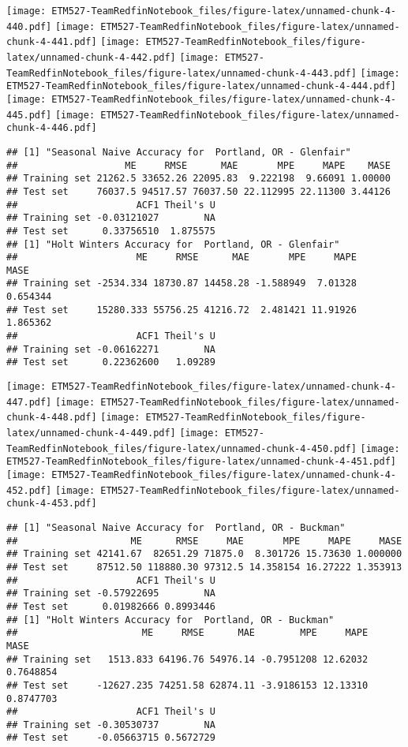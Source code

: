 \documentclass[]{article}
\begin{document}
\texttt{[image: ETM527-TeamRedfinNotebook\_files/figure-latex/unnamed-chunk-4-440.pdf]}
\texttt{[image: ETM527-TeamRedfinNotebook\_files/figure-latex/unnamed-chunk-4-441.pdf]}
\texttt{[image: ETM527-TeamRedfinNotebook\_files/figure-latex/unnamed-chunk-4-442.pdf]}
\texttt{[image: ETM527-TeamRedfinNotebook\_files/figure-latex/unnamed-chunk-4-443.pdf]}
\texttt{[image: ETM527-TeamRedfinNotebook\_files/figure-latex/unnamed-chunk-4-444.pdf]}
\texttt{[image: ETM527-TeamRedfinNotebook\_files/figure-latex/unnamed-chunk-4-445.pdf]}
\texttt{[image: ETM527-TeamRedfinNotebook\_files/figure-latex/unnamed-chunk-4-446.pdf]}

\begin{verbatim}
## [1] "Seasonal Naive Accuracy for  Portland, OR - Glenfair"
##                   ME     RMSE      MAE       MPE     MAPE    MASE
## Training set 21262.5 33652.26 22095.83  9.222198  9.66091 1.00000
## Test set     76037.5 94517.57 76037.50 22.112995 22.11300 3.44126
##                     ACF1 Theil's U
## Training set -0.03121027        NA
## Test set      0.33756510  1.875575
## [1] "Holt Winters Accuracy for  Portland, OR - Glenfair"
##                     ME     RMSE      MAE       MPE     MAPE     MASE
## Training set -2534.334 18730.87 14458.28 -1.588949  7.01328 0.654344
## Test set     15280.333 55756.25 41216.72  2.481421 11.91926 1.865362
##                     ACF1 Theil's U
## Training set -0.06162271        NA
## Test set      0.22362600   1.09289
\end{verbatim}

\texttt{[image: ETM527-TeamRedfinNotebook\_files/figure-latex/unnamed-chunk-4-447.pdf]}
\texttt{[image: ETM527-TeamRedfinNotebook\_files/figure-latex/unnamed-chunk-4-448.pdf]}
\texttt{[image: ETM527-TeamRedfinNotebook\_files/figure-latex/unnamed-chunk-4-449.pdf]}
\texttt{[image: ETM527-TeamRedfinNotebook\_files/figure-latex/unnamed-chunk-4-450.pdf]}
\texttt{[image: ETM527-TeamRedfinNotebook\_files/figure-latex/unnamed-chunk-4-451.pdf]}
\texttt{[image: ETM527-TeamRedfinNotebook\_files/figure-latex/unnamed-chunk-4-452.pdf]}
\texttt{[image: ETM527-TeamRedfinNotebook\_files/figure-latex/unnamed-chunk-4-453.pdf]}

\begin{verbatim}
## [1] "Seasonal Naive Accuracy for  Portland, OR - Buckman"
##                    ME      RMSE     MAE       MPE     MAPE     MASE
## Training set 42141.67  82651.29 71875.0  8.301726 15.73630 1.000000
## Test set     87512.50 118880.30 97312.5 14.358154 16.27222 1.353913
##                     ACF1 Theil's U
## Training set -0.57922695        NA
## Test set      0.01982666 0.8993446
## [1] "Holt Winters Accuracy for  Portland, OR - Buckman"
##                      ME     RMSE      MAE        MPE     MAPE      MASE
## Training set   1513.833 64196.76 54976.14 -0.7951208 12.62032 0.7648854
## Test set     -12627.235 74251.58 62874.11 -3.9186153 12.13310 0.8747703
##                     ACF1 Theil's U
## Training set -0.30530737        NA
## Test set     -0.05663715 0.5672729
\end{verbatim}
\end{document}

